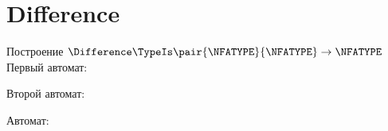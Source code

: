 \section{Difference}
\begin{frame}{Построение $\Difference\TypeIs\pair{\NFATYPE}{\NFATYPE}\to\NFATYPE$}
	Первый автомат:


	Второй автомат:


	Автомат:


\end{frame}
